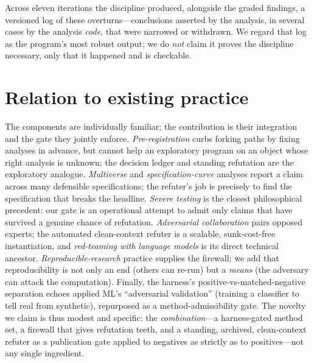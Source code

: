 \documentclass[11pt]{article}
\begin{document}
Across eleven iterations the discipline produced, alongside the graded findings, a versioned log
of these overturns---conclusions asserted by the analysis, in several cases by the analysis
\emph{code}, that were narrowed or withdrawn. We regard that log as the program's most robust
output; we do \emph{not} claim it proves the discipline necessary, only that it happened and
is checkable.

\section{Relation to existing practice}
The components are individually familiar; the contribution is their integration and the gate
they jointly enforce. \emph{Pre-registration} \citep{nosek2018preregistration} curbs forking
paths by fixing analyses in advance, but cannot help an exploratory program on an object whose
right analysis is unknown; the decision ledger and standing refutation are the exploratory
analogue. \emph{Multiverse} \citep{steegen2016multiverse} and \emph{specification-curve}
\citep{simonsohn2020specification} analyses report a claim across many defensible
specifications; the refuter's job is precisely to find the specification that breaks the
headline. \emph{Severe testing} \citep{mayo2018severe} is the closest philosophical
precedent: our gate is an operational attempt to admit only claims that have survived a
genuine chance of refutation. \emph{Adversarial collaboration} \citep{mellers2001adversarial}
pairs opposed experts; the automated clean-context refuter is a scalable, sunk-cost-free
instantiation, and \emph{red-teaming with language models} \citep{perez2022red} is its direct
technical ancestor. \emph{Reproducible-research} practice \citep{sandve2013ten} supplies the
firewall; we add that reproducibility is not only an end (others can re-run) but a
\emph{means} (the adversary can attack the computation). Finally, the harness's
positive-vs-matched-negative separation echoes applied ML's ``adversarial validation''
(training a classifier to tell real from synthetic), repurposed as a method-admissibility
gate. The novelty we claim is thus modest and specific: the \emph{combination}---a
harness-gated method set, a firewall that gives refutation teeth, and a standing, archived,
clean-context refuter as a publication gate applied to negatives as strictly as to
positives---not any single ingredient.
\end{document}
